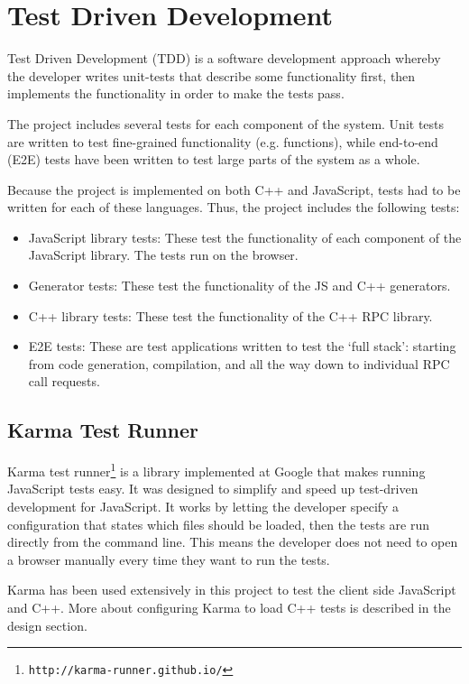 \section{Test Driven Development} %
\label{sec:test_driven_development}
Test Driven Development (TDD) is a software development approach whereby the developer writes unit-tests that describe some functionality first, then implements the functionality in order to make the tests pass.

The project includes several tests for each component of the system. Unit tests are written to test fine-grained functionality (e.g. functions), while end-to-end (E2E) tests have been written to test large parts of the system as a whole.

Because the project is implemented on both C++ and JavaScript, tests had to be written for each of these languages. Thus, the project includes the following tests:

\begin{itemize}
	\item JavaScript library tests: These test the functionality of each component of the JavaScript library. The tests run on the browser.
	\item Generator tests: These test the functionality of the JS and C++ generators.
	\item C++ library tests: These test the functionality of the C++ RPC library.
	\item E2E tests: These are test applications written to test the `full stack': starting from code generation, compilation, and all the way down to individual RPC call requests.
\end{itemize}

\subsection{Karma Test Runner} %
\label{sub:karma_test_runner}
Karma test runner\footnote{\lstinline+http://karma-runner.github.io/+} is a library implemented at Google that makes running JavaScript tests easy. It was designed to simplify and speed up test-driven development for JavaScript. It works by letting the developer specify a configuration that states which files should be loaded, then the tests are run directly from the command line. This means the developer does not need to open a browser manually every time they want to run the tests.

Karma has been used extensively in this project to test the client side JavaScript and C++. More about configuring Karma to load C++ tests is described in the design section.

